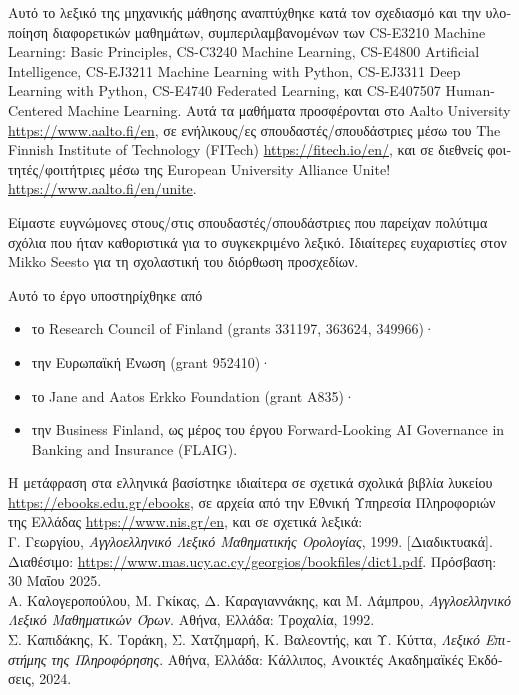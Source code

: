\documentclass[journal,12pt,onecolumn]{article}
\begin{document}
\noindent \foreignlanguage{greek}{Αυτό το λεξικό της μηχανικής μάθησης αναπτύχθηκε κατά τον σχεδιασμό
και την υλοποίηση διαφορετικών μαθημάτων, συμπεριλαμβανομένων των} CS-E3210 Machine Learning: 
Basic Principles, CS-C3240 Machine Learning, CS-E4800 Artificial Intelligence, CS-EJ3211 Machine Learning with 
Python, CS-EJ3311 Deep Learning with Python, CS-E4740 Federated Learning,
\foreignlanguage{greek}{και} CS-E407507 Human-Centered Machine Learning. \foreignlanguage{greek}{Αυτά τα 
μαθήματα προσφέρονται στο} Aalto University \url{https://www.aalto.fi/en}, \foreignlanguage{greek}{σε 
ενήλικους/ες σπουδαστές/σπουδάστριες μέσω του} The Finnish Institute of Technology (FITech) 
\url{https://fitech.io/en/}, \foreignlanguage{greek}{και σε διεθνείς φοιτητές/φοιτήτριες μέσω της} 
European University Alliance Unite! \url{https://www.aalto.fi/en/unite}.

\noindent \foreignlanguage{greek}{Είμαστε ευγνώμονες στους/στις σπουδαστές/σπουδάστριες που παρείχαν 
πολύτιμα σχόλια που ήταν καθοριστικά για το συγκεκριμένο λεξικό. Ιδιαίτερες ευχαριστίες στον} Mikko 
Seesto \foreignlanguage{greek}{για τη σχολαστική του διόρθωση προσχεδίων.} 

\noindent \foreignlanguage{greek}{Αυτό το έργο υποστηρίχθηκε από}
\begin{itemize} 
	\item \foreignlanguage{greek}{το} Research Council of Finland (grants 331197, 363624, 349966)·
	\item \foreignlanguage{greek}{την Ευρωπαϊκή Ένωση} (grant 952410)·
	\item \foreignlanguage{greek}{το} Jane and Aatos Erkko Foundation (grant A835)·
	\item \foreignlanguage{greek}{την} Business Finland, \foreignlanguage{greek}{ως μέρος του έργου} Forward-Looking AI Governance in Banking and Insurance (FLAIG).
\end{itemize} 

\noindent \foreignlanguage{greek}{Η μετάφραση στα ελληνικά βασίστηκε ιδιαίτερα σε σχετικά σχολικά βιβλία λυκείου} 
\url{https://ebooks.edu.gr/ebooks}, 
\foreignlanguage{greek}{σε αρχεία από την Εθνική Υπηρεσία Πληροφοριών της Ελλάδας} \url{https://www.nis.gr/en}, 
\foreignlanguage{greek}{και σε σχετικά λεξικά:} \\
\foreignlanguage{greek}{Γ. Γεωργίου}, \textit{\foreignlanguage{greek}{Αγγλοελληνικό Λεξικό Μαθηματικής Ορολογίας}}, 
1999. \foreignlanguage{greek}{[Διαδικτυακά]. Διαθέσιμο:} \url{https://www.mas.ucy.ac.cy/georgios/bookfiles/dict1.pdf}. 
\foreignlanguage{greek}{Πρόσβαση: 30 Μαΐου 2025.}\\
\foreignlanguage{greek}{Α. Καλογεροπούλου, Μ. Γκίκας, Δ. Καραγιαννάκης, και Μ. Λάμπρου}, 
\textit{\foreignlanguage{greek}{Αγγλοελληνικό Λεξικό Μαθηματικών Όρων}}. \foreignlanguage{greek}{Αθήνα, Ελλάδα: Τροχαλία, 1992.}\\
\foreignlanguage{greek}{Σ. Καπιδάκης, Κ. Τοράκη, Σ. Χατζημαρή, Κ. Βαλεοντής, και Υ. Κύττα}, 
\textit{\foreignlanguage{greek}{Λεξικό Επιστήμης της Πληροφόρησης}}. \foreignlanguage{greek}{Αθήνα, Ελλάδα: Κάλλιπος, 
Ανοικτές Ακαδημαϊκές Εκδόσεις, 2024.}
\end{document}
